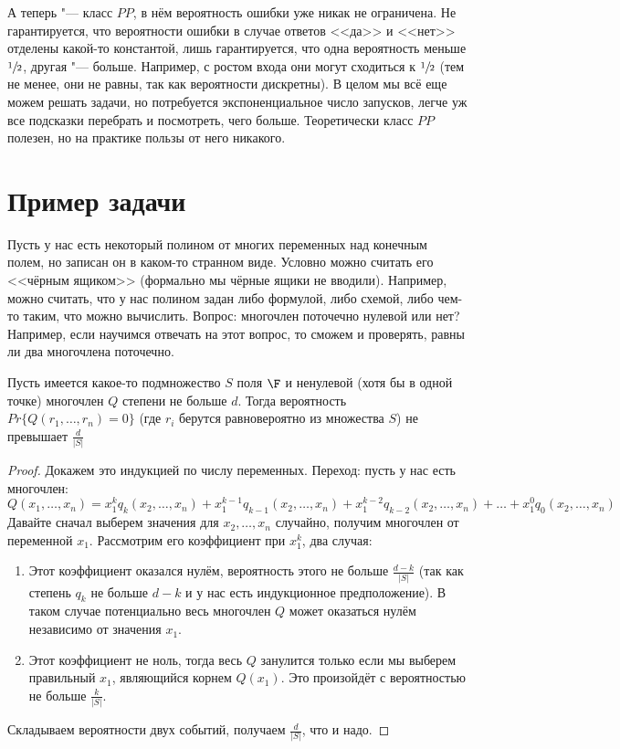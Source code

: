А теперь "--- класс $PP$, в нём вероятность ошибки уже никак не ограничена.
Не гарантируется, что вероятности ошибки в случае ответов <<да>> и <<нет>> отделены какой-то константой,
лишь гарантируется, что одна вероятность меньше $\sfrac 12$, другая "--- больше.
Например, с ростом входа они могут сходиться к $\sfrac 12$ (тем не менее, они не равны, так как
вероятности дискретны).
В целом мы всё еще можем решать задачи, но потребуется экспоненциальное число запусков, легче уж все подсказки
перебрать и посмотреть, чего больше.
Теоретически класс $PP$ полезен, но на практике пользы от него никакого.

\section{Пример задачи}
Пусть у нас есть некоторый полином от многих переменных над конечным полем, но записан он в каком-то странном виде.
Условно можно считать его <<чёрным ящиком>> (формально мы чёрные ящики не вводили).
Например, можно считать, что у нас полином задан либо формулой, либо схемой, либо чем-то таким,
что можно вычислить.
Вопрос: многочлен поточечно нулевой или нет?
Например, если научимся отвечать на этот вопрос, то сможем и проверять, равны ли два многочлена поточечно.

\begin{lemma}
	Пусть имеется какое-то подмножество $S$ поля $\F$ и ненулевой (хотя бы в одной точке) многочлен $Q$ степени не больше $d$.
	Тогда вероятность $Pr \{ Q(r_1, \dots, r_n) = 0 \}$ (где $r_i$ берутся равновероятно
	из множества $S$) не превышает $\frac{d}{|S|}$
\end{lemma}
\begin{proof}
	Докажем это индукцией по числу переменных.
	Переход: пусть у нас есть многочлен:
	\[
		Q(x_1, \dots, x_n) =
		x_1^k q_k(x_2, \dots, x_n) +
		x_1^{k-1} q_{k-1}(x_2, \dots, x_n) +
		x_1^{k-2} q_{k-2}(x_2, \dots, x_n) +
		\dots +
		x_1^0 q_0(x_2, \dots, x_n)
	\]
	Давайте сначал выберем значения для $x_2, \dots, x_n$ случайно, получим многочлен от переменной $x_1$.
	Рассмотрим его коэффициент при $x_1^k$, два случая:
	\begin{enumerate}
		\item
			Этот коэффициент оказался нулём, вероятность этого не больше $\frac{d-k}{|S|}$
			(так как степень $q_k$ не больше $d-k$ и у нас есть индукционное предположение).
			В таком случае потенциально весь многочлен $Q$ может оказаться нулём независимо от значения $x_1$.
		\item
			Этот коэффициент не ноль, тогда весь $Q$ занулится только если мы выберем правильный $x_1$,
			являющийся корнем $Q(x_1)$.
			Это произойдёт с вероятностью не больше $\frac{k}{|S|}$.
	\end{enumerate}
	Складываем вероятности двух событий, получаем $\frac{d}{|S|}$, что и надо.
\end{proof}

